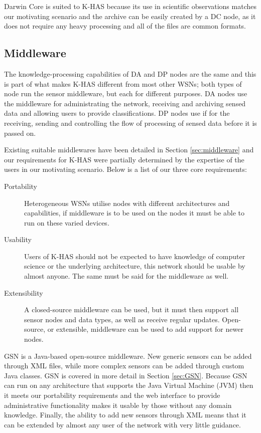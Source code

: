 Darwin Core is suited to K-HAS because its use in scientific observations matches our motivating scenario and the archive can be easily created by a DC node, as it does not require any heavy processing and all of the files are common formats.
	
	\subsection{Middleware}
	The knowledge-processing capabilities of DA and DP nodes are the same and this is part of what makes K-HAS different from most other WSNs; both types of node run the sensor middleware, but each for different purposes. DA nodes use the middleware for administrating the network, receiving and archiving sensed data and allowing users to provide classifications. DP nodes use if for the receiving, sending and controlling the flow of processing of sensed data before it is passed on.
	
	Existing suitable middlewares have been detailed in Section \ref{sec:middleware} and our requirements for K-HAS were partially determined by the expertise of the users in our motivating scenario. Below is a list of our three core requirements:
	\begin{description}
		\item[Portability] Heterogeneous WSNs utilise nodes with different architectures and capabilities, if middleware is to be used on the nodes it must be able to run on these varied devices. 
		\item[Usability] Users of K-HAS should not be expected to have knowledge of computer science or the underlying architecture, this network should be usable by almost anyone. The same must be said for the middleware as well.
		\item[Extensibility] A closed-source middleware can be used, but it must then support all sensor nodes and data types, as well as receive regular updates. Open-source, or extensible, middleware can be used to add support for newer nodes.
	\end{description}
	
	GSN is a Java-based open-source middleware. New generic sensors can be added through XML files, while more complex sensors can be added through custom Java classes. GSN is covered in more detail in Section \ref{sec:GSN}. Because GSN can run on any architecture that supports the Java Virtual Machine (JVM) then it meets our portability requirements and the web interface to provide administrative functionality makes it usable by those without any domain knowledge. Finally, the ability to add new sensors through XML means that it can be extended by almost any user of the network with very little guidance.
	
